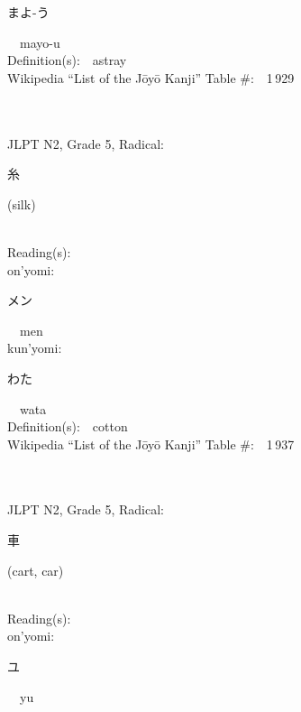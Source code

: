 \begin{multicols}{2}
{\hspace*{2em}}{\begin{CJK}{UTF8}{min} まよ-う \end{CJK}}\ \ mayo-u\ \ \\
Definition(s):\ \ astray \\
Wikipedia ``List of the J\=oy\=o Kanji'' Table \#:\ \ 1\,929 \\
\ \ \\
{\fontsize{34pt}{40pt}  }\ \ \\  %
{JLPT N2, Grade 5, Radical:\ \ {\begin{CJK}{UTF8}{min} 糸 \end{CJK}} (silk) } \\
Reading(s):\ \ \\
{\hspace*{1em}}on'yomi:\ \ \\
{\hspace*{2em}}{\begin{CJK}{UTF8}{min} メン \end{CJK}}\ \ men\ \ \\
{\hspace*{1em}}kun'yomi:\ \ \\
{\hspace*{2em}}{\begin{CJK}{UTF8}{min} わた \end{CJK}}\ \ wata\ \ \\
Definition(s):\ \ cotton \\
Wikipedia ``List of the J\=oy\=o Kanji'' Table \#:\ \ 1\,937 \\
\ \ \\
{\fontsize{34pt}{40pt}  }\ \ \\  %
{JLPT N2, Grade 5, Radical:\ \ {\begin{CJK}{UTF8}{min} 車 \end{CJK}} (cart, car) } \\
Reading(s):\ \ \\
{\hspace*{1em}}on'yomi:\ \ \\
{\hspace*{2em}}{\begin{CJK}{UTF8}{min} ユ \end{CJK}}\ \ yu\ \ \\

\end{multicols}
